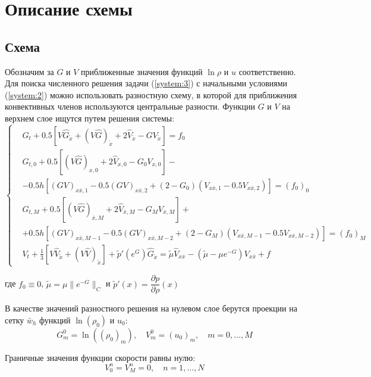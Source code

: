 \section{Описание схемы}

\subsection{Схема}
Обозначим за $G$ и $V$ приближенные значения функций $\ln \rho$ и $u$ соответственно.
Для поиска численного решения задачи (\ref{system:3}) с начальными условиями (\ref{system:2}) можно использовать разностную схему, в которой для приближения конвективных членов используются центральные разности.
Функции $G$ и $V$ на верхнем слое ищутся путем решения системы:
\begin{equation}
\label{system:4}
\left\{
 \begin{aligned}
  & 
    G_t + 0.5 [
      V \hat G_{\mathring{x}} + (V \hat G)_{\mathring{x}} +
      2 \hat V_{\mathring{x}} - G V_{\mathring{x}} ] = f_0 
  \\
  & 
    G_{t,0} + 0.5 [
      (V \hat G)_{x,0} + 2 \hat V_{x,0} - G_0 V_{x,0}] - \\
  & - 0.5h [
      (GV)_{x \bar x, 1} - 0.5(GV)_{x \bar x, 2} +
      (2 - G_0) (V_{x \bar x, 1} - 0.5V_{x \bar x, 2}) ] = (f_0)_0
  \\
  & 
    G_{t,M} + 0.5 [
      (V \hat G)_{\bar x,M} + 2 \hat V_{\bar x,M} - G_M V_{\bar x,M}] + \\
  & + 0.5h [
      (GV)_{x \bar x, M-1} - 0.5(GV)_{x \bar x, M-2} +
      (2 - G_M) (V_{x \bar x, M-1} - 0.5V_{x \bar x, M-2}) ] = (f_0)_{M}
  \\
  & 
    V_t + \frac13 [V \hat V_{\mathring{x}} + (V \hat V)_{\mathring{x}} ] + 
    \tilde{p}'(e^G) \hat G_{\mathring{x}} =
    \tilde{\mu} \hat V_{x \bar x} - 
    (\tilde{\mu} - \mu e^{-G}) V_{x \bar x} + f
 \end{aligned}
\right.
\end{equation}

где $f_0 \equiv 0$, $ \tilde{\mu} = \mu \lVert e^{-G} \rVert_C $ и 
$\tilde{p}'(x) = \dfrac{\partial p}{\partial \rho}(x)$

В качестве значений разностного решения на нулевом слое берутся проекции на
сетку $\bar w_h$ функций $\ln(\rho_0)$ и $u_0$:
$$
  G_{m}^{0} = \ln ((\rho_0)_m), \quad
  V_{m}^{0} = (u_0)_m, \quad
  m = 0,\dots,M
$$

Граничные значения функции скорости равны нулю:
\begin{equation}
\label{system:gran}
   V_{0}^{n} = V_{M}^{n} = 0, \quad
   n = 1,\dots,N
\end{equation}

